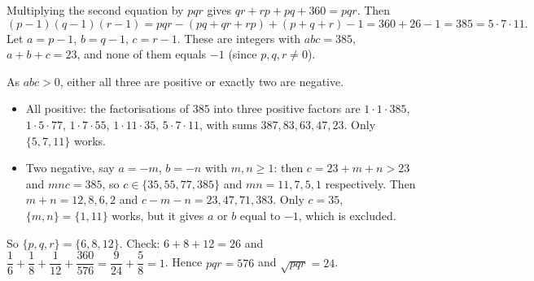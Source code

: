 Multiplying the second equation by $pqr$ gives $qr+rp+pq+360=pqr$. Then
\[
(p-1)(q-1)(r-1)=pqr-(pq+qr+rp)+(p+q+r)-1=360+26-1=385=5\cdot7\cdot11 .
\]
Let $a=p-1$, $b=q-1$, $c=r-1$. These are integers with $abc=385$, $a+b+c=23$, and none of them equals $-1$ (since $p,q,r\ne0$).

As $abc>0$, either all three are positive or exactly two are negative.
\begin{itemize}
\item All positive: the factorisations of $385$ into three positive factors are $1\cdot1\cdot385$, $1\cdot5\cdot77$, $1\cdot7\cdot55$, $1\cdot11\cdot35$, $5\cdot7\cdot11$, with sums $387,83,63,47,23$. Only $\{5,7,11\}$ works.
\item Two negative, say $a=-m$, $b=-n$ with $m,n\ge1$: then $c=23+m+n>23$ and $mnc=385$, so $c\in\{35,55,77,385\}$ and $mn=11,7,5,1$ respectively. Then $m+n=12,8,6,2$ and $c-m-n=23,47,71,383$. Only $c=35$, $\{m,n\}=\{1,11\}$ works, but it gives $a$ or $b$ equal to $-1$, which is excluded.
\end{itemize}
So $\{p,q,r\}=\{6,8,12\}$. Check: $6+8+12=26$ and $\dfrac{1}{6}+\dfrac{1}{8}+\dfrac{1}{12}+\dfrac{360}{576}=\dfrac{9}{24}+\dfrac{5}{8}=1$. Hence $pqr=576$ and $\sqrt{pqr}=\boxed{24}$.
